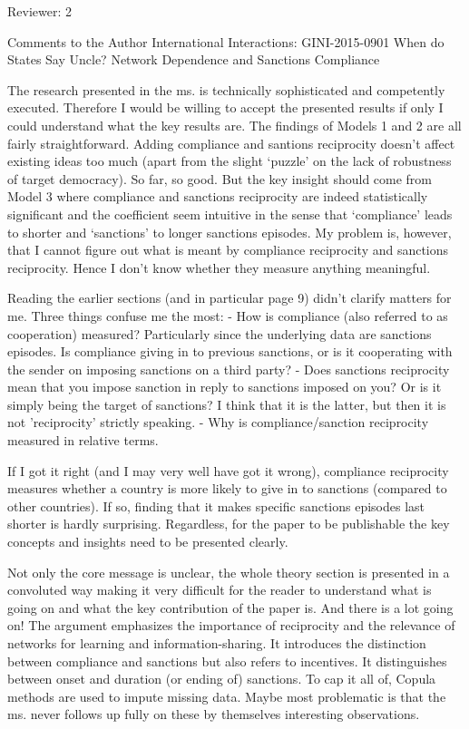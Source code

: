 Reviewer: 2

Comments to the Author
International Interactions: GINI-2015-0901
When do States Say Uncle? Network Dependence and Sanctions Compliance

The research presented in the ms. is technically sophisticated and competently executed. Therefore I would be willing to accept the presented results if only I could understand what the key results are. The findings of Models 1 and 2 are all fairly straightforward. Adding compliance and santions reciprocity doesn’t affect existing ideas too much (apart from the slight ‘puzzle’ on the lack of robustness of target democracy). So far, so good. But the key insight should come from Model 3 where compliance and sanctions reciprocity are indeed statistically significant and the coefficient seem intuitive in the sense that ‘compliance’ leads to shorter and ‘sanctions’ to longer sanctions episodes. My problem is, however, that I cannot figure out what is meant by compliance reciprocity and sanctions reciprocity. Hence I don’t know whether they measure anything meaningful.

Reading the earlier sections (and in particular page 9) didn’t clarify matters for me. Three things confuse me the most:
-       How is compliance (also referred to as cooperation) measured? Particularly since the underlying data are sanctions episodes. Is compliance giving in to previous sanctions, or is it cooperating with the sender on imposing sanctions on a third party?
-       Does sanctions reciprocity mean that you impose sanction in reply to sanctions imposed on you? Or is it simply being the target of sanctions? I think that it is the latter, but then it is not 'reciprocity' strictly speaking.
-       Why is compliance/sanction reciprocity measured in relative terms.

If I got it right (and I may very well have got it wrong), compliance reciprocity measures whether a country is more likely to give in to sanctions (compared to other countries). If so, finding that it makes specific sanctions episodes last shorter is hardly surprising. Regardless, for the paper to be publishable the key concepts and insights need to be presented clearly.

Not only the core message is unclear, the whole theory section is presented in a convoluted way making it very difficult for the reader to understand what is going on and what the key contribution of the paper is. And there is a lot going on! The argument emphasizes the importance of reciprocity and the relevance of networks for learning and information-sharing. It introduces the distinction between compliance and sanctions but also refers to incentives. It distinguishes between onset and duration (or ending of) sanctions. To cap it all of, Copula methods are used to impute missing data. Maybe most problematic is that the ms. never follows up fully on these by themselves interesting observations.


